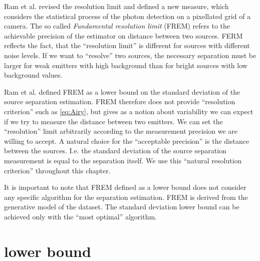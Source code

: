 Ram et al. \cite{Ram2006,Ram2006b} revised the resolution limit and defined a new measure, which considers the statistical process of the photon detection on a pixellated grid of a camera. The so called \emph{Fundamental resolution limit} (FREM) refers to the achievable precision of the estimator on distance between two sources. FERM reflects the fact, that the ``resolution limit'' is different for sources with different noise levels. If we want to ``resolve'' two sources, the necessary separation must be larger for weak emitters with high background than for bright sources with low background values.

Ram et al. defined FREM as a \CR lower bound on the standard deviation of the source separation estimation. FREM therefore does not provide ``resolution criterion'' such as \autoref{eq:Airy}, but gives as a notion about variability we can expect if we try to measure the distance between two emitters. We can set the ``resolution'' limit arbitrarily according to the measurement precision we are willing to accept. A natural choice for the ``acceptable precision'' is the distance between the sources. I.e. the standard deviation of the source separation measurement is equal to the separation itself. We use this ``natural resolution criterion'' throughout this chapter. 

It is important to note that FREM defined as a \CR lower bound does not consider any specific algorithm for the separation estimation. FREM is derived from the generative model of the dataset.  The standard deviation lower bound can be achieved only with the ``most optimal'' algorithm. 




\section{\CR lower bound\label{sec:CR}}

